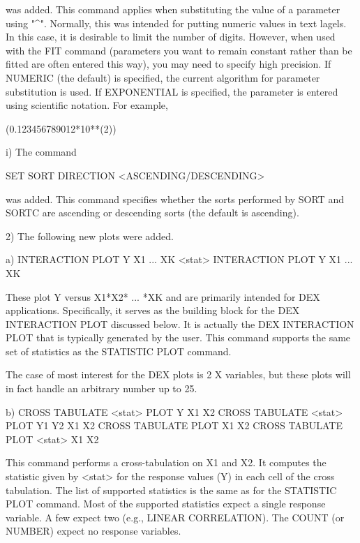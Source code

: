 {       was added.  This command applies when substituting the
       value of a parameter using "^".  Normally, this was
       intended for putting numeric values in text lagels.  In this
       case, it is desirable to limit the number of digits.  However,
       when used with the FIT command (parameters you want to remain
       constant rather than be fitted are often entered this way),
       you may need to specify high precision.  If NUMERIC (the
       default) is specified, the current algorithm for parameter
       substitution is used.  If EXPONENTIAL is specified, the 
       parameter is entered using scientific notation.  For example,

          (0.123456789012*10**(2))

    i) The command

          SET SORT DIRECTION <ASCENDING/DESCENDING>

       was added.  This command specifies whether the sorts
       performed by SORT and SORTC are ascending or descending
       sorts (the default is ascending).

 2) The following new plots were added.

    a) INTERACTION PLOT Y X1 ... XK
       <stat> INTERACTION PLOT Y X1 ... XK

       These plot Y versus X1*X2* ... *XK and are primarily intended
       for DEX applications.  Specifically, it serves as the
       building block for the DEX INTERACTION PLOT discussed below.
       It is actually the DEX INTERACTION PLOT that is typically
       generated by the user.  This command supports the same
       set of statistics as the STATISTIC PLOT command.
      
       The case of most interest for the DEX plots is 2 X variables,
       but these plots will in fact handle an arbitrary number
       up to 25.


    b) CROSS TABULATE <stat> PLOT Y X1 X2
       CROSS TABULATE <stat> PLOT Y1 Y2 X1 X2
       CROSS TABULATE PLOT X1 X2
       CROSS TABULATE PLOT <stat> X1 X2

       This command performs a cross-tabulation on X1 and X2.
       It computes the statistic given by <stat> for the response
       values (Y) in each cell of the cross tabulation.  The list
       of supported statistics is the same as for the
       STATISTIC PLOT command.  Most of the supported statistics
       expect a single response variable.  A few expect two
       (e.g., LINEAR CORRELATION).  The COUNT (or NUMBER) expect
       no response variables.

}
